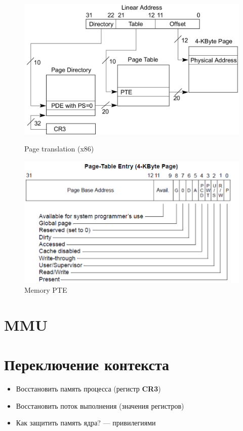 \documentclass[../../lectures.tex]{subfiles}
\begin{document}
\begin{figure}[H]
\begin{minipage}[c]{0.5\linewidth}
\centering
\includegraphics[width=\textwidth]{images/memory-x86-page-translation.png}
\caption{Page translation (x86)}
\end{minipage}
\hspace{0.5cm}
\begin{minipage}[c]{0.5\linewidth}
\centering
\includegraphics[width=\textwidth]{images/memory-pte.png}
\caption{Memory PTE}
\end{minipage}
\end{figure}

\section{MMU}
\todo{}

\section{Переключение контекста}
\begin{itemize}
    \item Восстановить память процесса (регистр \textbf{CR3})
    \item Восстановить поток выполнения (значения регистров)
    \item Как защитить память ядра? --- привилегиями
\end{itemize}
\end{document}
